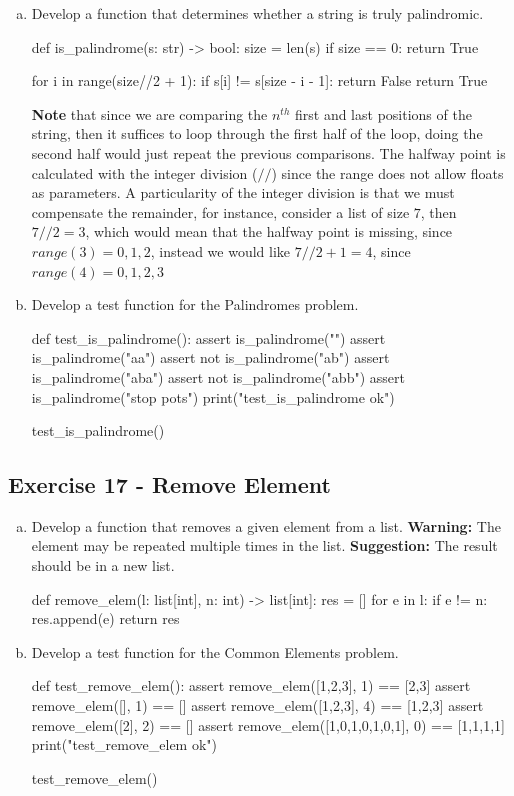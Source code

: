 \documentclass[12pt]{article}
\begin{document}
\begin{enumerate}[a)]
  \item Develop a function that determines whether a string is truly palindromic.
\newpage
\begin{pythonlst}
def is_palindrome(s: str) -> bool:
  size = len(s)
  if size == 0:
    return True

  for i in range(size//2 + 1):
    if s[i] != s[size - i - 1]:
      return False
  return True
\end{pythonlst}
\textbf{Note} that since we are comparing the $n^{th}$ first and last positions
of the string, then it suffices to loop through the first half of the loop,
doing the second half would just repeat the previous comparisons. The halfway
point is calculated with the integer division ($//$) since the range does not
allow floats as parameters. A particularity of the integer division is that we
must compensate the remainder, for instance, consider a list of size $7$, then 
$7//2 = 3$, which would mean that the halfway point is missing, since $range(3) 
= 0, 1, 2$, instead we would like $7//2 + 1 = 4$, since $range(4) = 0, 1, 2, 3$
  \item Develop a test function for the Palindromes problem.
\begin{pythonlst}
def test_is_palindrome():
  assert is_palindrome("")
  assert is_palindrome("aa")
  assert not is_palindrome("ab")
  assert is_palindrome("aba")
  assert not is_palindrome("abb")
  assert is_palindrome("stop pots")
  print("test_is_palindrome ok")

test_is_palindrome()
\end{pythonlst}
\end{enumerate}

\subsection*{Exercise 17 - Remove Element}
\begin{enumerate}[a)]
  \item Develop a function that removes a given element from a list. 
    \textbf{Warning:} The element may be repeated multiple times in the list.
    \textbf{Suggestion:} The result should be in a new list.
\begin{pythonlst}
def remove_elem(l: list[int], n: int) -> list[int]:
  res = []
  for e in l:
    if e != n:
      res.append(e)
  return res
\end{pythonlst}
  \item Develop a test function for the Common Elements problem.
\newpage
\begin{pythonlst}
def test_remove_elem():
  assert remove_elem([1,2,3], 1) == [2,3]
  assert remove_elem([], 1) == []
  assert remove_elem([1,2,3], 4) == [1,2,3]
  assert remove_elem([2], 2) == []
  assert remove_elem([1,0,1,0,1,0,1], 0) == [1,1,1,1]
  print("test_remove_elem ok")

test_remove_elem()
\end{pythonlst}
\end{enumerate}
\end{document}

